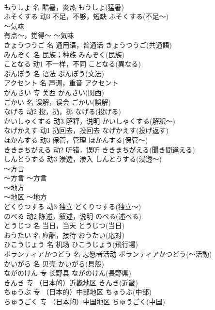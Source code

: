 \documentclass[8pt]{extreport}
\begin{document}
\begin{CJK}{UTF8}{min}
\\	もうしょ	名	酷暑，炎热	もうしょ(猛暑)	
\\	ふそくする	动3	不足，不够，短缺	ふそくする(不足～)	
\\	～気味	
\\	有点～，觉得～	～気味	
\\	きょうつうご	名	通用语，普通话	きょうつうご(共通語)	
\\	みんぞく	名	民族；种族	みんぞく(民族)	
\\	ことなる	动1	不一样，不同	ことなる(異なる)	
\\	ぶんぽう	名	语法	ぶんぽう(文法)	
\\	アクセント	名	声调，重音	アクセント	
\\	かんさい	专	关西	かんさい(関西)	
\\	ごかい	名	误解，误会	ごかい(誤解)	
\\	なげる	动2	投，扔，掷	なげる(投げる)	
\\	かいしゃくする	动3	解释，说明	かいしゃくする(解釈～)	
\\	なげかえす	动1	扔回去，投回去	なげかえす(投げ返す)	
\\	ほかんする	动3	保管，管理	ほかんする(保管～)	
\\	ききまちがえる	动2	听错，误听	ききまちがえる(聞き間違える)	
\\	しんとうする	动3	渗透，渗入	しんとうする(浸透～)	
\\	～方言	
\\	～方言	～方言	
\\	～地方	
\\	～地区	～地方	
\\	どくりつする	动3	独立	どくりつする(独立～)	
\\	のべる	动2	陈述，叙述，说明	のべる(述べる)	
\\	とうじつ	名	当日，当天	とうじつ(当日)	
\\	おうたい	名	应酬，接待	おうたい(応対)	
\\	ひこうじょう	名	机场	ひこうじょう(飛行場)	
\\	ボランティアかつどう	名	志愿者活动	ボランティアかつどう(～活動)	
\\	かいがら	名	贝壳	かいがら(貝殻)	
\\	ながのけん	专	长野县	ながのけん(長野県)	
\\	きんき	专	（日本的）近畿地区	きんき(近畿)	
\\	ちゅうぶ	专	（日本的）中部地区	ちゅうぶ(中部)	
\\	ちゅうごく	专	（日本的）中国地区	ちゅうごく(中国)	

\end{CJK}
\end{document}
